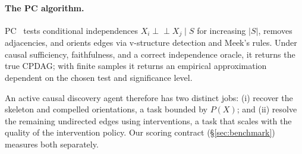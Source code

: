\paragraph{The PC algorithm.} PC~\citep{spirtes2000causation} tests conditional independences $X_i \perp\!\!\!\perp X_j \mid S$ for increasing $|S|$, removes adjacencies, and orients edges via v-structure detection and Meek's rules. Under causal sufficiency, faithfulness, and a correct independence oracle, it returns the true CPDAG; with finite samples it returns an empirical approximation dependent on the chosen test and significance level.

An active causal discovery agent therefore has two distinct jobs: (i) recover the skeleton and compelled orientations, a task bounded by $P(X)$; and (ii) resolve the remaining undirected edges using interventions, a task that scales with the quality of the intervention policy. Our scoring contract (\S\ref{sec:benchmark}) measures both separately.
